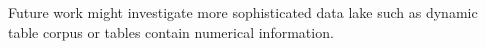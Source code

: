 Future work might investigate more
sophisticated data lake such as dynamic table corpus or tables contain numerical information.
